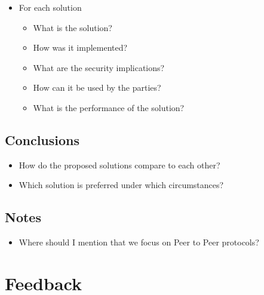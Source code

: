 \begin{itemize}
\tightlist
\item
  For each solution

  \begin{itemize}
  \tightlist
  \item
    What is the solution?
  \item
    How was it implemented?
  \item
    What are the security implications?
  \item
    How can it be used by the parties?
  \item
    What is the performance of the solution?
  \end{itemize}
\end{itemize}

\hypertarget{conclusions}{%
\section{Conclusions}\label{conclusions}}

\begin{itemize}
\tightlist
\item
  How do the proposed solutions compare to each other?
\item
  Which solution is preferred under which circumstances?
\end{itemize}

\hypertarget{notes}{%
\section{Notes}\label{notes}}

\begin{itemize}
\tightlist
\item
  Where should I mention that we focus on Peer to Peer protocols?
\end{itemize}

\hypertarget{feedback}{%
\chapter{Feedback}\label{feedback}}

